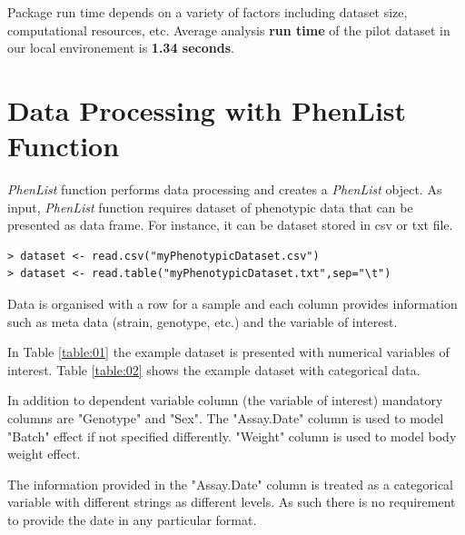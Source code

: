 \documentclass[12pt,a4paper]{article}
\begin{document}
Package run time depends on a variety of factors including dataset size, computational resources, etc. Average analysis \textbf{run time} of the pilot dataset in our local environement is \textbf{1.34 seconds}. 


\section{Data Processing with PhenList Function}
\textit{PhenList} function performs data processing and creates a \textit{PhenList} object. 
As input, \textit{PhenList} function requires dataset of phenotypic data that can be presented as data frame. For instance, it can be dataset stored in csv or txt file. 


\begingroup
    \fontsize{8pt}{12pt}\selectfont
\begin{verbatim}
> dataset <- read.csv("myPhenotypicDataset.csv")
> dataset <- read.table("myPhenotypicDataset.txt",sep="\t")
\end{verbatim}
\endgroup
Data is organised with a row for a sample and each column provides information such as meta data (strain, genotype, etc.) and the variable of interest.

In Table \ref{table:01} the example dataset is presented with numerical variables of interest. Table \ref{table:02} shows the example dataset with categorical data. 

In addition to dependent variable column (the variable of interest) mandatory columns are "Genotype" and "Sex". The "Assay.Date" column is used to model "Batch" effect if not specified differently. "Weight" column is used to model body weight effect.

The information provided in the "Assay.Date" column is treated as a categorical variable with different strings as different levels.  As such there is no requirement to provide the date in any particular format.
\end{document}
